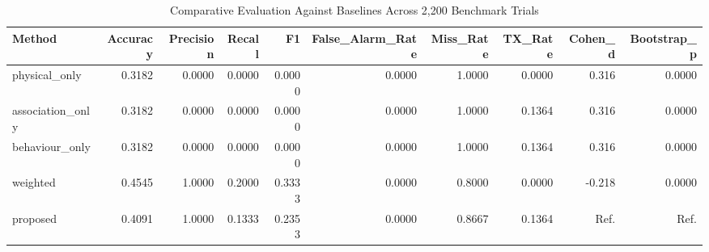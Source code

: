 \begin{table}[htbp]
\centering
\caption{Comparative Evaluation Against Baselines Across 2,200 Benchmark Trials}
\begin{tabular}{lrrrrrrrrr}
\toprule
Method & Accuracy & Precision & Recall & F1 & False\_Alarm\_Rate & Miss\_Rate & TX\_Rate & Cohen\_d & Bootstrap\_p \\
\midrule
physical\_only & 0.3182 & 0.0000 & 0.0000 & 0.0000 & 0.0000 & 1.0000 & 0.0000 & 0.316 & 0.0000 \\
association\_only & 0.3182 & 0.0000 & 0.0000 & 0.0000 & 0.0000 & 1.0000 & 0.1364 & 0.316 & 0.0000 \\
behaviour\_only & 0.3182 & 0.0000 & 0.0000 & 0.0000 & 0.0000 & 1.0000 & 0.1364 & 0.316 & 0.0000 \\
weighted & 0.4545 & 1.0000 & 0.2000 & 0.3333 & 0.0000 & 0.8000 & 0.0000 & -0.218 & 0.0000 \\
proposed & 0.4091 & 1.0000 & 0.1333 & 0.2353 & 0.0000 & 0.8667 & 0.1364 & Ref. & Ref. \\
\bottomrule
\end{tabular}
\end{table}
